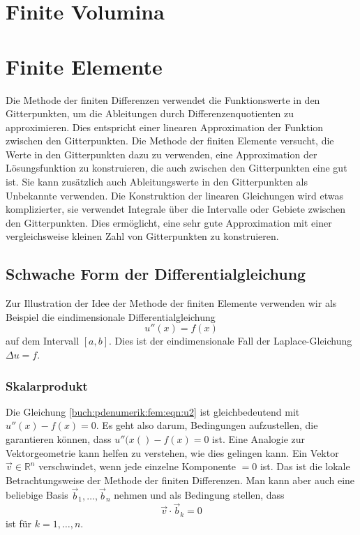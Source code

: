 %
%
\section{Finite Volumina
\label{buch:pdenumerik:section:fvm}}

%
%
\section{Finite Elemente
\label{buch:pdenumerik:section:fem}}
Die Methode der finiten Differenzen verwendet die Funktionswerte
in den Gitterpunkten, um die Ableitungen durch Differenzenquotienten
zu approximieren.
Dies entspricht einer linearen Approximation der Funktion zwischen
den Gitterpunkten.
Die Methode der finiten Elemente versucht, die Werte in den
Gitterpunkten dazu zu verwenden, eine Approximation der Lösungsfunktion
zu konstruieren, die auch zwischen den Gitterpunkten eine gut ist.
Sie kann zusätzlich auch Ableitungswerte in den Gitterpunkten als
Unbekannte verwenden.
Die Konstruktion der linearen Gleichungen wird etwas komplizierter,
sie verwendet Integrale über die Intervalle oder Gebiete zwischen
den Gitterpunkten.
Dies ermöglicht, eine sehr gute Approximation mit einer vergleichsweise
kleinen Zahl von Gitterpunkten zu konstruieren.

%
%
\subsection{Schwache Form der Differentialgleichung}
Zur Illustration der Idee der Methode der finiten Elemente verwenden wir
als Beispiel die eindimensionale Differentialgleichung
\begin{equation}
u''(x) = f(x)
\label{buch:pdenumerik:fem:eqn:u2}
\end{equation}
auf dem Intervall $[a,b]$.
Dies ist der eindimensionale Fall der Laplace-Gleichung $\Delta u = f$.

%
%
\subsubsection{Skalarprodukt}
Die Gleichung \eqref{buch:pdenumerik:fem:eqn:u2} ist gleichbedeutend
mit $u''(x)-f(x)=0$.
Es geht also darum, Bedingungen aufzustellen, die garantieren können,
dass $u''(x()-f(x)=0$ ist.
Eine Analogie zur Vektorgeometrie kann helfen zu verstehen, wie dies 
gelingen kann.
Ein Vektor $\vec{v}\in\mathbb{R}^n$ verschwindet, wenn jede einzelne
Komponente $=0$ ist.
Das ist die lokale Betrachtungsweise der Methode der finiten Differenzen.
Man kann aber auch eine beliebige Basis $\vec{b}_1,\dots,\vec{b}_n$ nehmen
und als Bedingung stellen, dass 
\[
\vec{v}\cdot\vec{b}_k = 0
\]
ist für $k=1,\dots,n$.

